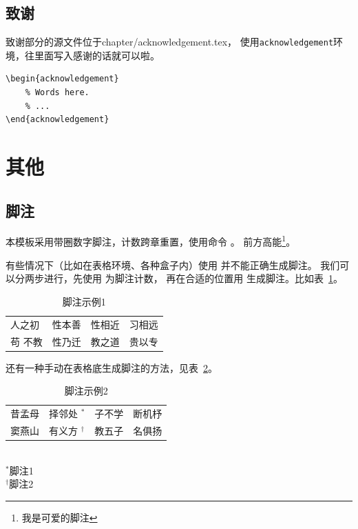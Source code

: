 \subsection{致谢}
致谢部分的源文件位于\textsf{chapter/acknowledgement.tex}，
使用\texttt{acknowledgement}环境，往里面写入感谢的话就可以啦。
\begin{lstlisting}
\begin{acknowledgement}
	% Words here.
	% ...
\end{acknowledgement}
		\end{lstlisting}

\section{其他}\label{sec:other}

\subsection{脚注}\label{subsec:footnote}
本模板采用带圈数字脚注，计数跨章重置，使用命令 。
前方高能\footnote{我是可爱的脚注}。

有些情况下（比如在表格环境、各种盒子内）使用 并不能正确生成脚注。
我们可以分两步进行，先使用  为脚注计数，
再在合适的位置用  生成脚注。比如表~\ref{tab:ftnt1}。
\begin{table}[H]
	\centering
	\caption{脚注示例1}
	\label{tab:ftnt1}
	\begin{tabular}{llll}
		\hline
		人之初                & 性本善 & 性相近 & 习相远 \\
		苟 \footnotemark 不教 & 性乃迁 & 教之道 & 贵以专 \\
		\hline
	\end{tabular}
\end{table}

还有一种手动在表格底生成脚注的方法，见表~\ref{tab:ftnt2}。
\begin{table}[htbp]
	\centering
	\caption{脚注示例2}
	\label{tab:ftnt2}
	\begin{minipage}[H]{7.5cm}
		\begin{tabular}{llll}
			\hline
			昔孟母 & 择邻处 $^{*}$       & 子不学 & 断机杼 \\
			窦燕山 & 有义方 $^{\dagger}$ & 教五子 & 名俱扬 \\
			\hline
		\end{tabular}\\[3pt]
		\footnotesize
		$^*$脚注1\\
		$^\dagger$脚注2
	\end{minipage}
\end{table}

